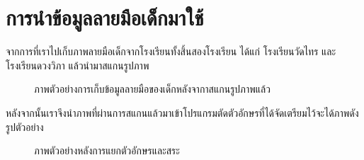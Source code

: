 \documentclass[12pt,oneside,openright,a4paper]{cpe-thai-project}
\begin{document}
\section{การนำข้อมูลลายมือเด็กมาใช้}
จากการที่เราไปเก็บภาพลายมือเด็กจากโรงเรียนทั้งสิ้นสองโรงเรียน ได้แก่ โรงเรียนวัดไทร และ โรงเรียนดวงวิภา แล้วนำมาสแกนรูปภาพ  
\begin{figure}[!ht]\centering
  \setlength{\fboxrule}{0.2mm} %
  \setlength{\fboxsep}{1cm}
  \caption{ภาพตัวอย่างการเก็บข้อมูลลายมือของเด็กหลังจากาสแกนรูปภาพแล้ว}\label{fig:childrenTest}
\end{figure}
หลังจากนั้นเราจึงนำภาพที่ผ่านการสแกนแล้วมาเข้าโปรแกรมตัดตัวอักษรที่ได้จัดเตรียมไว้จะได้ภาพดังรูปตัวอย่าง
\newpage
\begin{figure}[!ht]\centering
  \setlength{\fboxrule}{0.2mm} %
  \setlength{\fboxsep}{1cm}
  \caption{ภาพตัวอย่างหลังการแยกตัวอักษรและสระ}\label{fig:childrenTest}
\end{figure}
\newpage
\end{document}
